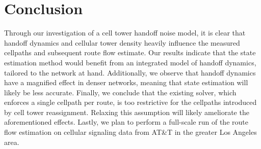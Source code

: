 
\section{Conclusion}
Through our investigation of a cell tower handoff noise model, it is clear that handoff dynamics and cellular tower density heavily influence the measured cellpaths and subsequent route flow estimate. Our results indicate that the state estimation method would benefit from an integrated model of handoff dynamics, tailored to the network at hand. Additionally, we observe that handoff dynamics have a magnified effect in denser networks, meaning that state estimation will likely be less accurate. Finally, we conclude that the existing solver, which enforces a single cellpath per route, is too restrictive for the cellpaths introduced by cell tower reassignment. Relaxing this assumption will likely ameliorate the aforementioned effects. Lastly, we plan to perform a full-scale run of the route flow estimation on cellular signaling data from AT\&T in the greater Los Angeles area.
